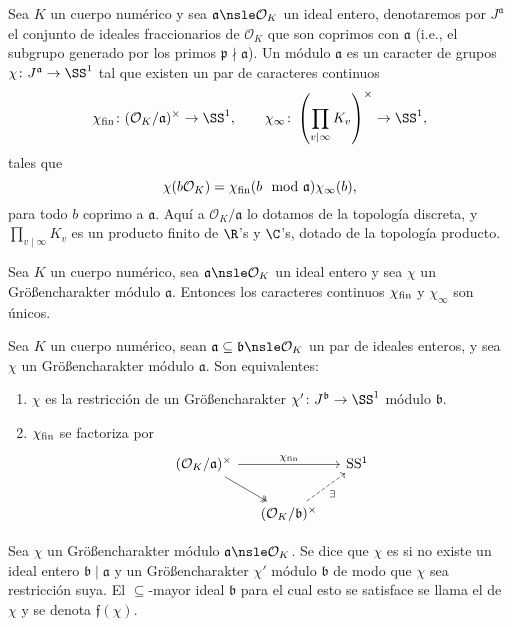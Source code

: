 \documentclass[teoria-numeros.tex]{subfiles}
\begin{document}
\begin{mydef}[Hecke]
	Sea $K$ un cuerpo numérico y sea $\mathfrak{a} \nsle \mathcal{O}_K$ un ideal entero,
	denotaremos por $J^{\mathfrak{a}}$ el conjunto de ideales fraccionarios de $\mathcal{O}_K$ que son coprimos con $\mathfrak{a}$
	(i.e., el subgrupo generado por los primos $\mathfrak{p \nmid a}$).
	Un \footnotemark{} módulo $\mathfrak{a}$
	es un caracter de grupos $\chi \colon J^{\mathfrak{a}} \to \SS^1$ tal que existen un par de caracteres continuos
	\[
		\chi_{\rm fin} \colon (\mathcal{O}_K / \mathfrak{a})^\times \to \SS^1, \qquad
		\chi_{\infty}  \colon \left( \prod_{v \mid \infty} K_v \right)^\times \to \SS^1,
	\]
	tales que
	$$ \chi(b \mathcal{O}_K) = \chi_{\rm fin}(b \mod{\mathfrak{a}}) \chi_\infty(b), $$
	para todo $b$ coprimo a $\mathfrak{a}$.
	Aquí a $\mathcal{O}_K / \mathfrak{a}$ lo dotamos de la topología discreta,
	y $\prod_{v\mid\infty} K_v$ es un producto finito de $\R$'s y $\C$'s, dotado de la topología producto.
\end{mydef}
\begin{cor}
	Sea $K$ un cuerpo numérico, sea $\mathfrak{a} \nsle \mathcal{O}_K$ un ideal entero y sea $\chi$ un Größencharakter módulo $\mathfrak{a}$.
	Entonces los caracteres continuos $\chi_{\rm fin}$ y $\chi_\infty$ son únicos.
\end{cor}

\begin{prop}
	Sea $K$ un cuerpo numérico, sean $\mathfrak{a \subseteq b} \nsle \mathcal{O}_K$ un par de ideales enteros,
	y sea $\chi$ un Größencharakter módulo $\mathfrak{a}$.
	Son equivalentes:
	\begin{enumerate}
		\item $\chi$ es la restricción de un Größencharakter $\chi' \colon J^{\mathfrak{b}} \to \SS^1$ módulo $\mathfrak{b}$.
		\item $\chi_{\rm fin}$ se factoriza por
			\[\begin{tikzcd}[column sep=small]
				(\mathcal{O}_K/\mathfrak{a})^\times \ar[rr, "\chi_{\rm fin}"] \drar[two heads] &                                                               & \SS^1 \\
												               & (\mathcal{O}_K/\mathfrak{b})^\times \urar["\exists"', dashed]
			\end{tikzcd}\]
	\end{enumerate}
\end{prop}
\begin{mydef}
	Sea $\chi$ un Größencharakter módulo $\mathfrak{a} \nsle \mathcal{O}_K$.
	Se dice que $\chi$ es  si no existe un ideal entero $\mathfrak{b \mid a}$
	y un Größencharakter $\chi'$ módulo $\mathfrak{b}$ de modo que $\chi$ sea restricción suya.
	El $\subseteq$-mayor ideal $\mathfrak{b}$ para el cual esto se satisface se llama el  de $\chi$ y se denota $\mathfrak{f}(\chi)$.
\end{mydef}
\end{document}
